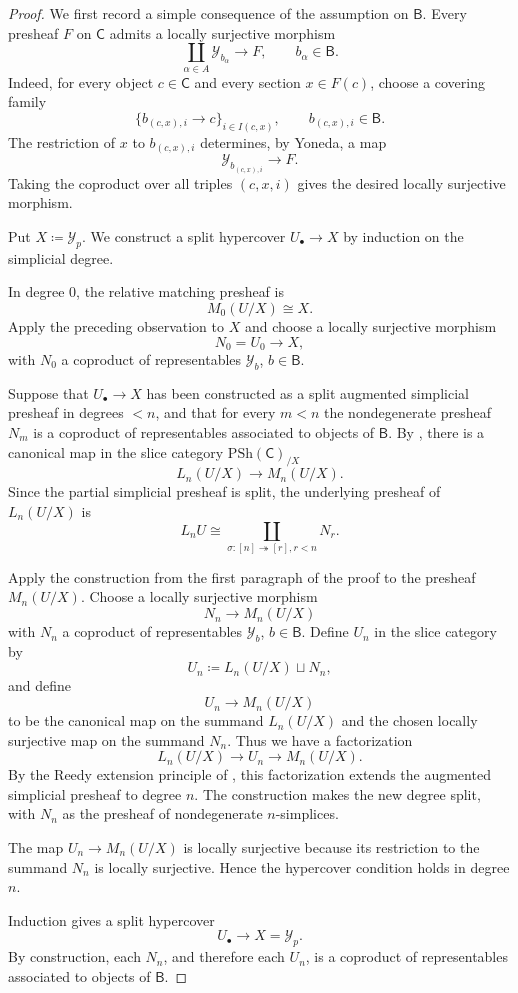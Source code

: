 \documentclass{amsart}
\newcommand{\cat}[1]{\mathsf{#1}}
\newcommand{\psh}{\mathrm{PSh}}
\newcommand{\Yo}{\mathscr{Y}}
\theoremstyle{definition}
\numberwithin{equation}{subsection}
\numberwithin{subsubsection}{subsection}
\begin{document}
\begin{proof}
  We first record a simple consequence of the assumption on \(\cat{B}\).
  Every presheaf \(F\) on \(\cat{C}\) admits a locally surjective morphism
  \[
    \coprod_{\alpha\in A}\Yo_{b_\alpha}\longrightarrow F,
    \qquad b_\alpha\in\cat{B}.
  \]
  Indeed, for every object \(c\in\cat{C}\) and every section
  \(x\in F(c)\), choose a covering family
  \[
    \{b_{(c,x),i}\to c\}_{i\in I(c,x)},
    \qquad b_{(c,x),i}\in\cat{B}.
  \]
  The restriction of \(x\) to \(b_{(c,x),i}\) determines, by Yoneda, a map
  \[
    \Yo_{b_{(c,x),i}}\longrightarrow F.
  \]
  Taking the coproduct over all triples \((c,x,i)\) gives the desired
  locally surjective morphism.

  Put \(X\coloneqq\Yo_p\). We construct a split hypercover
  \(U_{\bullet}\to X\) by induction on the simplicial degree.

  In degree \(0\), the relative matching presheaf is
  \[
    M_0(U/X)\cong X.
  \]
  Apply the preceding observation to \(X\) and choose a locally surjective
  morphism
  \[
    N_0=U_0\longrightarrow X,
  \]
  with \(N_0\) a coproduct of representables \(\Yo_b\), \(b\in\cat{B}\).

  Suppose that \(U_{\bullet}\to X\) has been constructed as a split
  augmented simplicial presheaf in degrees \(<n\), and that for every
  \(m<n\) the nondegenerate presheaf \(N_m\) is a coproduct of
  representables associated to objects of \(\cat{B}\). By
  , there is a canonical map
  in the slice category \(\psh(\cat{C})_{/X}\)
  \[
    L_n(U/X)\longrightarrow M_n(U/X).
  \]
  Since the partial simplicial presheaf is split, the underlying presheaf of
  \(L_n(U/X)\) is
  \[
    L_nU\cong
    \coprod_{\sigma:[n]\twoheadrightarrow[r], r<n}N_r.
  \]

  Apply the construction from the first paragraph of the proof to the presheaf
  \(M_n(U/X)\). Choose a
  locally surjective morphism
  \[
    N_n\longrightarrow M_n(U/X)
  \]
  with \(N_n\) a coproduct of representables \(\Yo_b\), \(b\in\cat{B}\).
  Define \(U_n\) in the slice category by
  \[
    U_n\coloneqq L_n(U/X)\sqcup N_n,
  \]
  and define
  \[
    U_n\longrightarrow M_n(U/X)
  \]
  to be the canonical map on the summand \(L_n(U/X)\) and the chosen
  locally surjective map on the summand \(N_n\). Thus we have a
  factorization
  \[
    L_n(U/X)\longrightarrow U_n\longrightarrow M_n(U/X).
  \]
  By the Reedy extension principle of
  , this factorization extends
  the augmented simplicial presheaf to degree \(n\). The construction makes
  the new degree split, with \(N_n\) as the presheaf of nondegenerate
  \(n\)-simplices.

  The map \(U_n\to M_n(U/X)\) is locally surjective because its restriction
  to the summand \(N_n\) is locally surjective. Hence the hypercover
  condition holds in degree \(n\).

  Induction gives a split hypercover
  \[
    U_{\bullet}\longrightarrow X=\Yo_p.
  \]
  By construction, each \(N_n\), and therefore each \(U_n\), is a coproduct
  of representables associated to objects of \(\cat{B}\).
\end{proof}
\end{document}
